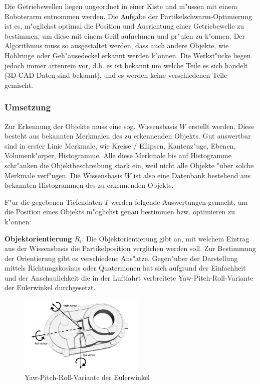 Die Getriebewellen liegen ungeordnet in einer Kiste und m"ussen mit einem
Roboterarm entnommen werden. Die Aufgabe der Partikelschwarm-Optimierung
ist es, m"oglichst optimal die Position und Ausrichtung einer
Getriebewelle zu bestimmen, um diese mit einem Griff aufnehmen und
pr"ufen zu k"onnen.
Der Algorithmus muss so ausgestaltet werden, dass auch andere Objekte,
wie Hohlringe oder Geh"ausedeckel erkannt werden k"onnen. Die Werkst"ucke
liegen jedoch immer artenrein vor, d.h. es ist bekannt um welche
Teile es sich handelt (3D-CAD Daten sind bekannt), und es werden keine
verschiedenen Teile gemischt.

\subsubsection{Umsetzung}
Zur Erkennung der Objekte muss eine sog. Wissensbasis $W$ erstellt
werden. Diese besteht aus bekannten Merkmalen des zu erkennenden
Objekts. Gut auswertbar sind in erster Linie Merkmale, wie Kreise /
Ellipsen, Kantenz"uge, Ebenen, Volumenk"orper, Histogramme. Alle diese
Merkmale bis auf Histogramme schr"anken die Objektbeschreibung stark ein,
weil nicht alle Objekte "uber solche Merkmale verf"ugen. Die Wissensbasis
$W$ ist also eine Datenbank bestehend aus bekannten Histogrammen des zu
erkennenden Objekts.

F"ur die gegebenen Tiefendaten $T$ werden folgende Auswertungen gemacht,
um die Position eines Objekts m"oglichst genau bestimmen bzw. optimieren
zu k"onnen:

\textbf{Objektorientierung $R_i$}: Die Objektorientierung gibt an, mit
welchem Eintrag aus der Wissensbasis die Partikelposition verglichen
werden soll. Zur Bestimmung der Orientierung gibt es verschiedene
Ans"atze. Gegen"uber der Darstellung mittels Richtungskosinus oder
Quaternionen hat sich aufgrund der Einfachheit und der Anschaulichkeit
die in der Luftfahrt verbreitete Yaw-Pitch-Roll-Variante der Eulerwinkel
durchgesetzt.

\begin{figure}[htbp]
	\centering
	\includegraphics[width=6cm]{partikelschwarm/yaw-pitch-roll}
	\caption{Yaw-Pitch-Roll-Variante der Eulerwinkel}
	\label{Fig-Yaw-Pitch-Roll}
\end{figure}

